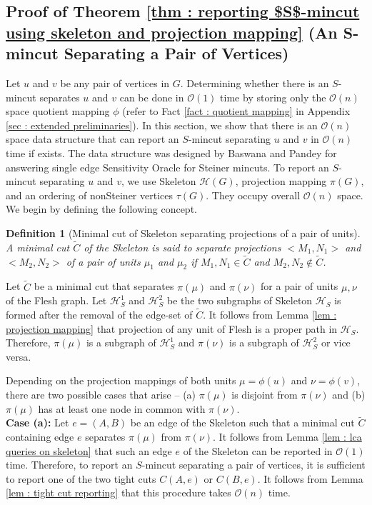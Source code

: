 \documentclass[letterpaper,11pt]{article}
\newtheorem{definition}{Definition}[]
\begin{document}
\subsection{Proof of Theorem \ref{thm : reporting $S$-mincut using skeleton and projection mapping} (An S-mincut Separating a Pair of Vertices)} \label{app : proof of theorem 58 for reporting S mincut separating vertices}
Let $u$ and $v$ be any pair of vertices in $G$. Determining whether there is an $S$-mincut separates $u$ and $v$ can be done in ${\mathcal O}(1)$ time by storing only the ${\mathcal O}(n)$ space quotient mapping $\phi$ (refer to Fact \ref{fact : quotient mapping} in Appendix \ref{sec : extended preliminaries}). In this section, we show that there is an ${\mathcal O}(n)$ space data structure that can report an $S$-mincut separating $u$ and $v$ in ${\mathcal O}(n)$ time if exists.
The data structure was designed by Baswana and Pandey \cite{DBLP:conf/soda/BaswanaP22} for answering single edge Sensitivity Oracle for Steiner mincuts. To report an $S$-mincut separating $u$ and $v$, we use Skeleton ${\mathcal H}(G)$, projection mapping $\pi(G)$, and an ordering of nonSteiner vertices $\tau(G)$. They occupy overall ${\mathcal O}(n)$ space. We begin by defining the following concept.
\begin{definition} [Minimal cut of Skeleton separating projections of a pair of units]
    A minimal cut $\tilde C$ of the Skeleton is said to separate projections $<M_1,N_1>$ and $<M_2,N_2>$ of a pair of units $\mu_1$ and $\mu_2$ if $M_1,N_1\in \tilde C$ and $M_2,N_2\notin \tilde C$.    
\end{definition}
 Let $\tilde C$ be a minimal cut that separates $\pi(\mu)$ and $\pi(\nu)$ for a pair of units $\mu,\nu$ of the Flesh graph. Let ${\mathcal H}_S^1$ and ${\mathcal H}_S^2$ be the two subgraphs of Skeleton ${\mathcal H}_S$ is formed after the removal of the edge-set of $\tilde C$. It follows from Lemma \ref{lem : projection mapping} that projection of any unit of Flesh is a proper path in ${\mathcal H}_S$. Therefore, $\pi(\mu)$ is a subgraph of ${\mathcal H}_S^1$ and $\pi(\nu)$ is a subgraph of ${\mathcal H}_S^2$ or vice versa.
 
 Depending on the projection mappings of both units $\mu=\phi(u)$ and $\nu=\phi(v)$, there are two possible cases that arise -- (a) $\pi(\mu)$ is disjoint from $\pi(\nu)$ and (b) $\pi(\mu)$ has at least one node in common with $\pi(\nu)$. \\

\noindent 
\textbf{Case (a):} Let $e=(A,B)$ be an edge of the Skeleton such that a minimal cut $\tilde C$ containing edge $e$ separates $\pi(\mu)$ from $\pi(\nu)$. It follows from Lemma \ref{lem : lca queries on skeleton} that such an edge $e$ of the Skeleton can be reported in ${\mathcal O}(1)$ time. Therefore, to report an $S$-mincut separating a pair of vertices, it is sufficient to report one of the two tight cuts $C(A,e)$ or $C(B,e)$. It follows from Lemma \ref{lem : tight cut reporting} that this procedure takes ${\mathcal O}(n)$ time. \\
\end{document}
